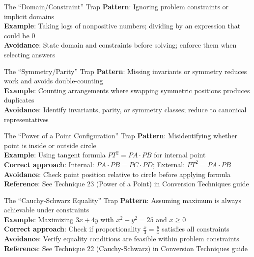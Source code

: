 \documentclass{article}
\begin{document}
\begin{trapbox}{The ``Domain/Constraint'' Trap}
\textbf{Pattern}: Ignoring problem constraints or implicit domains\\
\textbf{Example}: Taking logs of nonpositive numbers; dividing by an expression that could be 0\\
\textbf{Avoidance}: State domain and constraints before solving; enforce them when selecting answers
\end{trapbox}

\begin{trapbox}{The ``Symmetry/Parity'' Trap}
\textbf{Pattern}: Missing invariants or symmetry reduces work and avoids double-counting\\
\textbf{Example}: Counting arrangements where swapping symmetric positions produces duplicates\\
\textbf{Avoidance}: Identify invariants, parity, or symmetry classes; reduce to canonical representatives
\end{trapbox}

\begin{trapbox}{The ``Power of a Point Configuration'' Trap}
\textbf{Pattern}: Misidentifying whether point is inside or outside circle\\
\textbf{Example}: Using tangent formula $PT^2 = PA \cdot PB$ for internal point\\
\textbf{Correct approach}: Internal: $PA \cdot PB = PC \cdot PD$; External: $PT^2 = PA \cdot PB$\\
\textbf{Avoidance}: Check point position relative to circle before applying formula\\
\textbf{Reference}: See Technique 23 (Power of a Point) in Conversion Techniques guide
\end{trapbox}

\begin{trapbox}{The ``Cauchy-Schwarz Equality'' Trap}
\textbf{Pattern}: Assuming maximum is always achievable under constraints\\
\textbf{Example}: Maximizing $3x + 4y$ with $x^2 + y^2 = 25$ and $x \geq 0$\\
\textbf{Correct approach}: Check if proportionality $\frac{x}{3} = \frac{y}{4}$ satisfies all constraints\\
\textbf{Avoidance}: Verify equality conditions are feasible within problem constraints\\
\textbf{Reference}: See Technique 22 (Cauchy-Schwarz) in Conversion Techniques guide
\end{trapbox}
\end{document}
